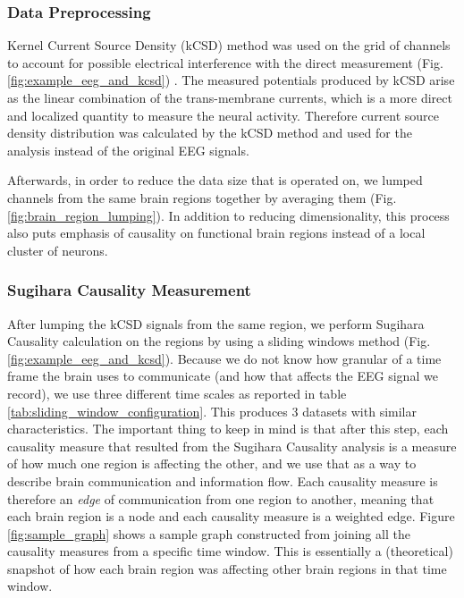 \documentclass[journal,12pt,onecolumn,draftclsnofoot]{IEEEtran}  %
\begin{document}
\subsubsection{Data Preprocessing}
Kernel Current Source Density (kCSD) method was used on the grid of channels to account for possible electrical interference with the direct measurement (Fig. \ref{fig:example_eeg_and_kcsd}) \cite{Potworowski2012}. The measured potentials produced by kCSD arise as the linear combination of the trans-membrane currents, which is a more direct and localized quantity to measure the neural activity. Therefore current source density distribution was calculated by the kCSD method and used for the analysis instead of the original EEG signals.

Afterwards, in order to reduce the data size that is operated on, we lumped channels from the same brain regions together by averaging them (Fig. \ref{fig:brain_region_lumping}). In addition to reducing dimensionality, this process also puts emphasis of causality on functional brain regions instead of a local cluster of neurons. 

\subsubsection{Sugihara Causality Measurement}
After lumping the kCSD signals from the same region, we perform Sugihara Causality calculation on the regions by using a sliding windows method (Fig. \ref{fig:example_eeg_and_kcsd}). Because we do not know how granular of a time frame the brain uses to communicate (and how that affects the EEG signal we record), we use three different time scales as reported in table \ref{tab:sliding_window_configuration}. This produces 3 datasets with similar characteristics. The important thing to keep in mind is that after this step, each causality measure that resulted from the Sugihara Causality analysis is a measure of how much one region is affecting the other, and we use that as a way to describe brain communication and information flow. Each causality measure is therefore an \textit{edge} of communication from one region to another, meaning that each brain region is a node and each causality measure is a weighted edge. Figure \ref{fig:sample_graph} shows a sample graph constructed from joining all the causality measures from a specific time window. This is essentially a (theoretical) snapshot of how each brain region was affecting other brain regions in that time window.
\end{document}
